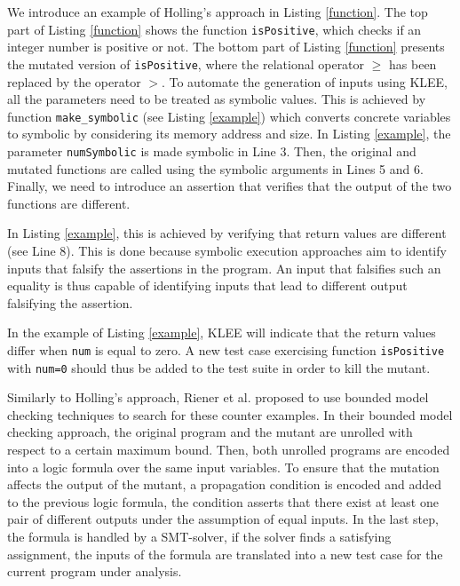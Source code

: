 We introduce an example of Holling's approach in Listing \ref{function}. The top part of Listing \ref{function} shows the function \texttt{isPositive}, which checks if an integer number is positive or not. The bottom part of Listing \ref{function} presents the mutated version of \texttt{isPositive}, where the relational operator $\geq$ has been replaced by the operator $>$.
To automate the generation of inputs using KLEE, all the parameters need to be treated as symbolic values.
This is achieved by function \texttt{make\_symbolic} (see Listing \ref{example}) which converts concrete variables to symbolic by considering its memory address and size. 
In Listing \ref{example}, the parameter \texttt{numSymbolic} is made symbolic in Line 3. Then, the original and mutated functions are called using the symbolic arguments in Lines 5 and 6.
Finally, we need to introduce an assertion that verifies that the output of the two functions are different. 

In Listing \ref{example}, this is achieved by verifying that return values are different (see Line 8). 
This is done because symbolic execution approaches aim to identify inputs that falsify the assertions in the program. 
An input that falsifies such an equality is thus capable of identifying inputs that lead to different output falsifying the assertion.

In the example of Listing \ref{example}, KLEE will indicate that the return values differ when \texttt{num} is equal to zero.
A new test case exercising function \texttt{isPositive} with \texttt{num=0} should thus be added to the test suite in order to kill the mutant.



Similarly to Holling's approach, Riener et al. \cite{riener2011test} proposed to use bounded model checking techniques to search for these counter examples.
In their bounded model checking approach, the original program and the mutant are unrolled with respect to a certain maximum bound. Then, both unrolled programs are encoded into a logic formula over the same input variables. To ensure that the mutation affects the output of the mutant, a propagation condition is encoded and added to the previous logic formula, the condition asserts that there exist at least one pair of different outputs under the assumption of equal inputs. In the last step, the formula is handled by a SMT-solver, if the solver finds a satisfying assignment, the inputs of the formula are translated into a new test case for the current program under analysis.

